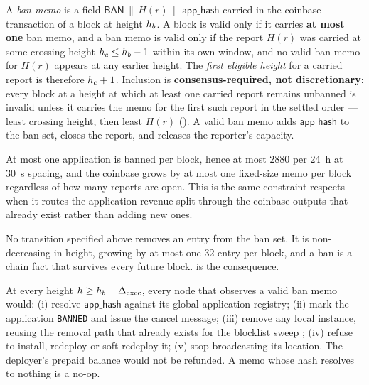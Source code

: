 \begin{definition}
\label{def:23:ban}
A \emph{ban memo} is a field $\mathsf{BAN}\,\|\,H(r)\,\|\,\mathsf{app\_hash}$ carried in the
coinbase transaction of a \PoN{} block at height $h_b$. A block is valid only if it carries
\textbf{at most one} ban memo, and a ban memo is valid only if the report $H(r)$ was carried at
some crossing height $h_c \le h_b - 1$ within its own window, and no valid ban memo for
$H(r)$ appears at any earlier height. The \emph{first eligible height} for a carried report is
therefore $h_c + 1$. Inclusion is \textbf{consensus-required, not discretionary}: every block at
a height at which at least one carried report remains unbanned is invalid unless it carries the
memo for the first such report in the settled order --- least crossing height, then least $H(r)$
(). A valid ban memo adds $\mathsf{app\_hash}$ to the ban set,
closes the report, and releases the reporter's capacity.
\end{definition}

\begin{property}
\label{prop:23:throughput}
At most one application is banned per block, hence at most $\num{2880}$ per \SI{24}{\hour} at
\SI{30}{\second} spacing, and the coinbase grows by at most one fixed-size memo per block
regardless of how many reports are open. This is the same constraint  respects
when it routes the application-revenue split through the coinbase outputs that already exist rather
than adding new ones.
\end{property}

\begin{property}
\label{prop:23:monotone}
No transition specified above removes an entry from the ban set. It is non-decreasing in height,
growing by at most one \SI{32}{\byte} entry per block, and a ban is a chain fact that survives
every future block.  is the consequence.
\end{property}

\begin{definition}
\label{def:23:enforcement}
At every height $h \ge h_b + \Delta_{\mathrm{exec}}$, every \FluxOS{} node that observes a
valid ban memo would: (i) resolve $\mathsf{app\_hash}$ against its global application registry;
(ii) mark the application \texttt{BANNED} and issue the cancel message; (iii) remove any local
instance, reusing the removal path that already exists for the blocklist sweep
; (iv) refuse to install,
redeploy or soft-redeploy it; (v) stop broadcasting its location. The deployer's prepaid balance
would not be refunded. A memo whose hash resolves to nothing is a no-op.
\end{definition}

